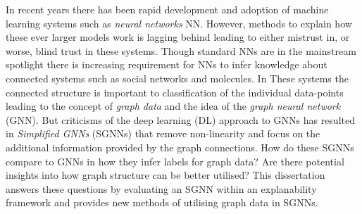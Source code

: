 In recent years there has been rapid development and adoption of machine learning systems such as \emph{neural networks} NN.
However, methods to explain how these ever larger models work is lagging behind leading to either mistrust in, or worse, blind trust in these systems.
Though standard NNs are in the mainstream spotlight there is increasing requirement for NNs to infer knowledge about connected systems such as social networks and molecules.
In These systems the connected structure is important to classification of the individual data-points leading to the concept of \emph{graph data} and the idea of the \emph{graph neural network} (GNN).
But criticisms of the deep learning (DL) approach to GNNs has resulted in \emph{Simplified GNNs} (SGNNs) that remove non-linearity and focus on the additional information provided by the graph connections.
How do these SGNNs compare to GNNs in how they infer labels for graph data?
Are there potential insights into how graph structure can be better utilised?
This dissertation answers these questions by evaluating an SGNN within an explanability framework and provides new methods of utilising graph data in SGNNs.



